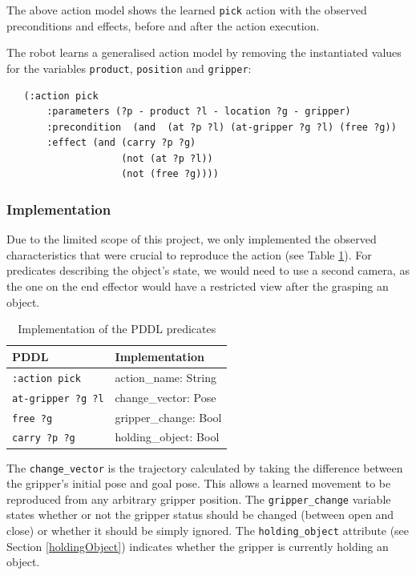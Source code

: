 The above action model shows the learned \texttt{pick} action with the observed preconditions and effects, before and after the action execution.

The robot learns a generalised action model by removing the instantiated values for the variables \texttt{product}, \texttt{position} and \texttt{gripper}:

\begin{verbatim}
   (:action pick
       :parameters (?p - product ?l - location ?g - gripper)
       :precondition  (and  (at ?p ?l) (at-gripper ?g ?l) (free ?g))
       :effect (and (carry ?p ?g)
                    (not (at ?p ?l)) 
                    (not (free ?g))))
\end{verbatim}

\subsubsection{Implementation}
Due to the limited scope of this project, we only implemented the observed characteristics that were crucial to reproduce the action (see Table \ref{tab:PDDL implementation}).
For predicates describing the object's state, we would need to use a second camera, as the one on the end effector would have a restricted view after the grasping an object.

\begin{table}[h]
\begin{center}
\begin{tabular}{l|l}
PDDL & Implementation\\ \hline
\texttt{:action pick} & action_name: String\\
\texttt{at-gripper ?g ?l} & change_vector: Pose\\
\texttt{free ?g } & gripper_change: Bool\\
\texttt{carry ?p ?g} & holding_object: Bool
\end{tabular}
\label{tab:PDDL implementation}
\caption{Implementation of the PDDL predicates}
\end{center}
\end{table}

The \texttt{change_vector} is the trajectory calculated by taking the difference between the gripper's initial pose and goal pose.
This allows a learned movement to be reproduced from any arbitrary gripper position.
The \texttt{gripper_change} variable states whether or not the gripper status should be changed (between open and close) or whether it should be simply ignored.
The \texttt{holding_object} attribute (see Section \ref{holdingObject}) indicates whether the gripper is currently holding an object.

